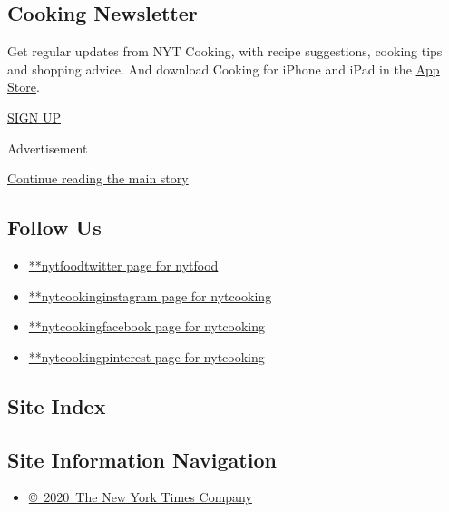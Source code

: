 \hypertarget{cooking-newsletter}{%
\subsection{Cooking Newsletter}\label{cooking-newsletter}}

Get regular updates from NYT Cooking, with recipe suggestions, cooking
tips and shopping advice. And download Cooking for iPhone and iPad in
the
\href{https://itunes.apple.com/us/app/nyt-cooking-recipes-from-new/id911422904?mt=8}{App
Store}.

\href{/newsletters/signup/CK}{SIGN UP}

Advertisement

\protect\hyperlink{after-mktg}{Continue reading the main story}

\hypertarget{follow-us}{%
\subsection{Follow Us}\label{follow-us}}

\begin{itemize}
\tightlist
\item
  \href{https://twitter.com/nytfood}{**nytfoodtwitter page for nytfood}
\item
  \href{https://instagram.com/nytcooking}{**nytcookinginstagram page for
  nytcooking}
\item
  \href{https://www.facebook.com/nytcooking}{**nytcookingfacebook page
  for nytcooking}
\item
  \href{https://pinterest.com/nytcooking}{**nytcookingpinterest page for
  nytcooking}
\end{itemize}

\hypertarget{site-index}{%
\subsection{Site Index}\label{site-index}}

\hypertarget{site-information-navigation}{%
\subsection{Site Information
Navigation}\label{site-information-navigation}}

\begin{itemize}
\tightlist
\item
  \href{https://help.nytimes.com/hc/en-us/articles/115014792127-Copyright-notice}{©~2020~The
  New York Times Company}
\end{itemize}

